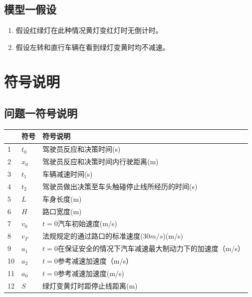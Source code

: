 \documentclass[withoutpreface,bwprint]{cumcmthesis}
\newcommand{\headcol}[1]{\textbf{#1}} %
\begin{document}
\subsection{模型一假设}
\begin{enumerate}
  \item 假设红绿灯在此种情况黄灯变红灯时无倒计时。
  \item 假设左转和直行车辆在看到绿灯变黄时均不减速。
\end{enumerate}

\section{符号说明}
\subsection{问题一符号说明}
\begin{table}[htb!]
  \centering
  \small
  \begin{tabular}{p{60pt}<{\centering}|p{60pt}<{\centering}p{180pt}<{\raggedright}}
   \hline
   \rowcolor{gray!25} %
   \headcol \textbf{序号} & \textbf{符号} & \textbf{符号说明} \\
   \hline
    1 & $t_0$ & 驾驶员反应和决策时间(s) \\
    2 & $x_0$ & 驾驶员反应和决策时间内行驶距离(m) \\
    3 & $t_1$ & 车辆减速时间(s)\\
    4 & $t_2$ & 驾驶员做出决策至车头触碰停止线所经历的时间(s)\\
    5 & $L$ & 车身长度(m) \\
    6 & $H$ & 路口宽度(m) \\
    7 & $v_0$ & $t = 0$汽车初始速度(m/s) \\
    8 & $v_F$ & 法规规定的通过路口的标准速度($30m/s$)(m/s) \\
    9 & $a_1$ & $t = 0$在保证安全的情况下汽车减速最大制动力下的加速度（m/s） \\
    10 & $a_2$ & $t = 0$参考减速加速度（m/s） \\
    11 & $a_0$ & $t = 0$参考减速加速度(m/s) \\
    12 & $S$ & 绿灯变黄灯时距停止线距离(m) \\
	\hline
  \end{tabular}
  \label{symbol}
\end{table}
\end{document}
